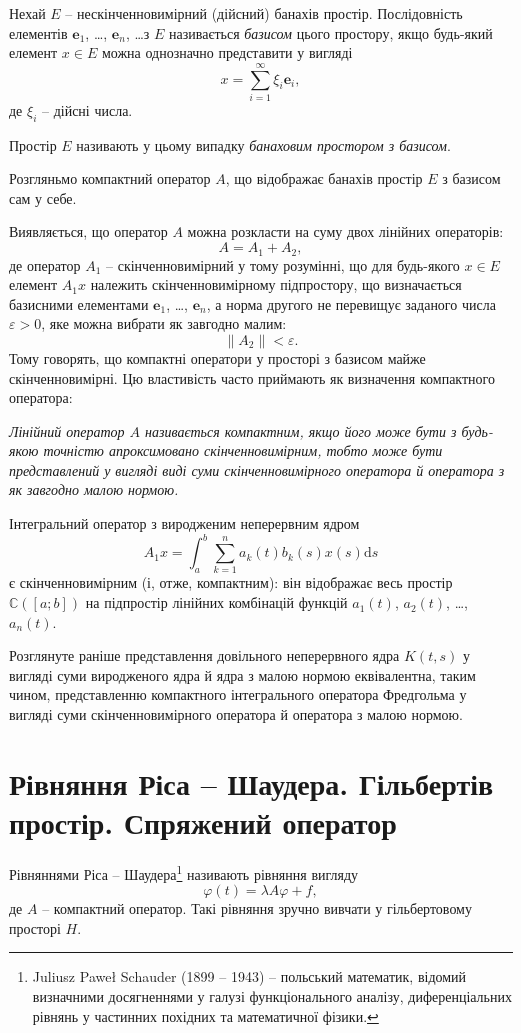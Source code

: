 \documentclass[14pt,twoside]{extreport}
\theoremstyle{mystyle}
\numberwithin{equation}{chapter}
\newcommand{\cab}{\mathbb{C}([a; b])}
\begin{document}
Нехай $E$ -- нескінченновимірний (дійсний) банахів простір. Послідовність елементів $\mathbf{e}_1$, \ldots, $\mathbf{e}_n$, \ldots з $E$ називається \emph{базисом} цього простору, якщо будь-який елемент $x\in E$ можна однозначно представити у вигляді
\[
 x=\sum_{i=1}^{\infty} \xi_i \mathbf{e}_i,
\]
де $\xi_i$ -- дійсні числа.

Простір $E$ називають у цьому випадку \emph{банаховим простором з базисом}.

Розгляньмо компактний оператор $A$, що відображає банахів простір $E$ з базисом сам у себе.

Виявляється, що оператор $A$ можна розкласти на суму двох лінійних операторів:
\[
 A=A_1 + A_2,
\]
де оператор $A_1$ -- скінченновимірний у тому розумінні, що для будь-якого $x \in E$ елемент $A_1 x$ належить скінченновимірному підпростору, що визначається базисними елементами $\mathbf{e}_1$, \ldots, $\mathbf{e}_n$, а норма другого не перевищує заданого числа $\varepsilon > 0$, яке можна вибрати як завгодно малим:
\[
 \|A_2\|<\varepsilon .
\]
Тому говорять, що компактні оператори у просторі з базисом майже скінченновимірні. Цю властивість часто приймають як визначення компактного оператора:

\emph{Лінійний оператор $A$ називається компактним, якщо його може бути з будь-якою точністю апроксимовано скінченновимірним, тобто може бути представлений у вигляді виді суми скінченновимірного оператора й оператора з як завгодно малою нормою.}

Інтегральний оператор з виродженим неперервним ядром
\[
 A_1 x = \int_{a}^{b} \sum_{k=1}^{n} a_k(t) b_k(s) x(s) \mathrm{d}s
\]
є скінченновимірним (і, отже, компактним): він відображає весь простір $\cab$ на підпростір лінійних комбінацій функцій $a_1(t)$, $a_2(t)$, \ldots, $a_n(t)$.

Розглянуте раніше представлення довільного неперервного ядра $K(t, s)$ у вигляді суми виродженого ядра й ядра з малою нормою еквівалентна, таким чином, представленню компактного інтегрального оператора Фредгольма у вигляді суми скінченновимірного оператора й оператора з малою нормою.

\section{Рівняння Ріса -- Шаудера. Гільбертів простір. Спряжений оператор}

Рівняннями Ріса -- Шаудера\footnote{Juliusz Paweł Schauder (1899 -- 1943) -- польський математик, відомий визначними досягненнями у галузі функціонального аналізу, диференціальних рівнянь у частинних похідних та математичної фізики.} називають рівняння вигляду
\begin{equation}\label{riesz_shauder}
 \varphi (t) = \lambda A \varphi + f,
\end{equation}
де $A$ -- компактний оператор. Такі рівняння зручно вивчати у гільбертовому просторі $H$.
\end{document}
